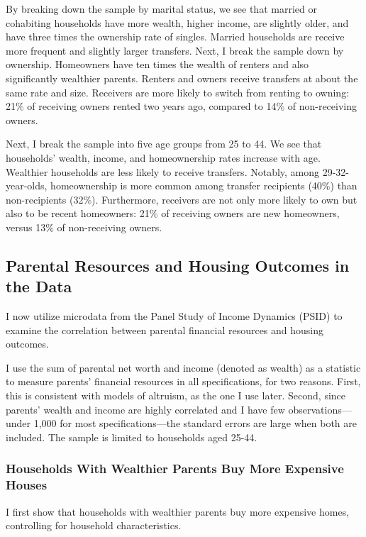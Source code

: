 \documentclass[12pt]{article}
\begin{document}
By breaking down the sample by marital status, we see that married or cohabiting households have more wealth, higher income, are slightly older, and have three times the ownership rate of singles. Married households are receive more frequent and slightly larger transfers. Next, I break the sample down by ownership. Homeowners have ten times the wealth of renters and also significantly wealthier parents. Renters and owners receive transfers at about the same rate and size. Receivers are more likely to switch from renting to owning: 21\% of receiving owners rented two years ago, compared to 14\% of non-receiving owners.

Next, I break the sample into five age groups from 25 to 44. We see that households' wealth, income, and homeownership rates increase with age. Wealthier households are less likely to receive transfers. Notably, among 29-32-year-olds, homeownership is more common among transfer recipients (40\%) than non-recipients (32\%). Furthermore, receivers are not only more likely to own but also to be recent homeowners: 21\% of receiving owners are new homeowners, versus 13\% of non-receiving owners.



\subsection{Parental Resources and Housing Outcomes in the Data}\label{sec:dataregr} 

I now utilize microdata from the Panel Study of Income Dynamics (PSID) to examine the correlation between parental financial resources and housing outcomes.

I use the sum of parental net worth and income (denoted as wealth) as a statistic to measure parents' financial resources in all specifications, for two reasons. First, this is consistent with models of altruism, as the one I use later. Second, since parents' wealth and income are highly correlated and I have few observations---under 1,000 for most specifications---the standard errors are large when both are included. The sample is limited to households aged 25-44. 

\subsubsection{Households With Wealthier Parents Buy More Expensive Houses}
I first show that households with wealthier parents buy more expensive homes, controlling for household characteristics.
\end{document}
